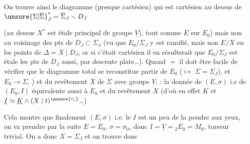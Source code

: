 On trouve ainsi le diagramme (presque cartésien)
qui est cartésien au dessus de $\unsure{\Sigma|\overline\Sigma}_J^*=\overline\Sigma_J\smallsetminus D_J$

(au dessus  $X^*$ est étale  principal de groupe $\underline V$), tout comme $E$ sur $E_0$) mais non au voisinage des pts de $D_J\subset\Sigma_J$ (vu que $E_0/\Sigma_J$ y est ramifié, mais non $E/X$ en les points de $\Delta=X\mid D_J$, or si c'était cartésien il en résulterait que $E_0/\Sigma_J$ est étale  les pts de $D_J$ aussi, par descente plate\ldots). Quand $=$ il doit être facile de vérifier que le diagramme total se reconstitue  partir de $E_0$ ($\longmapsto$  $\Sigma=\Sigma_{\underline J}$), et $E_0\longrightarrow\Sigma$, ) et du revêtement  $X$ de $\Sigma$ avec groupe  $\underline V$, : la donnée de $(E,\sigma)$ i.e de $(E_0,I)$   équivalente aussi à $E_0$ et du revêtement $X$ (d'où en effet $\underline K$ et $\underline I\simeq\underline K\wedge(X\mid t)^{\unsure{\prime|,}}$\ldots)

Cela montre que finalement $(E,\sigma)$ i.e. le $I$ est un peu de la poudre aux yeux, on va prendre par la suite $E=E_0$, $\sigma=\sigma_0$, donc $I=\underline V={}_2E_0=M_0$, torseur trivial. On a donc  $X=\Sigma_J$ et on trouve donc


